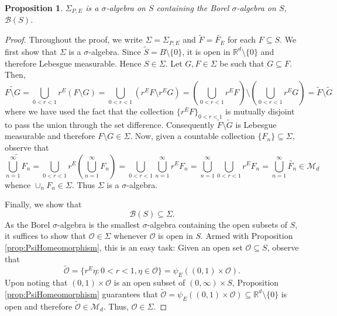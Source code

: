 \documentclass[11pt]{article}
\newtheorem{proposition}[theorem]{Proposition}
\theoremstyle{remark}
\begin{document}
\begin{proposition}\label{prop:BorelContainment}
$\Sigma_{P,E}$ is a $\sigma$-algebra on $S$ containing the Borel $\sigma$-algebra on $S$, $\mathcal{B}(S)$.
\end{proposition}

\begin{proof}
Throughout the proof, we write $\Sigma=\Sigma_{P,E}$ and $\widetilde{F}=\widetilde{F_E}$ for each $F\subseteq S$.
We first show that $\Sigma$ is a $\sigma$-algebra. Since $\widetilde S=B\setminus\{0\}$, it is open in $\mathbb{R}^d\setminus\{0\}$ and therefore Lebesgue measurable. Hence $S\in \Sigma$. Let $G, F\in \Sigma$ be such that $G\subseteq F$. Then,
\begin{equation*}
\widetilde{F\setminus G}=\bigcup_{0<r<1}r^E\left(F\setminus G\right)=\bigcup_{0<r<1}\left(r^EF\setminus r^E G\right)=\left(\bigcup_{0<r<1}r^E F\right)\setminus\left(\bigcup_{0<r<1}r^E G\right)=\widetilde F\setminus \widetilde G
\end{equation*}
where we have used the fact that the collection $\{r^E F\}_{0<r<1}$ is mutually disjoint to pass the union through the set difference. Consequently $\widetilde F\setminus \widetilde{G}$ is Lebesgue measurable and therefore $F\setminus G\in \Sigma$.  Now, given a countable collection $\{F_n\}\subseteq \Sigma$, observe that
\begin{equation*}
    \widetilde{\bigcup_{n=1}^\infty F_n}= \bigcup_{0<r<1}r^E \left(\bigcup_{n=1}^\infty F_n\right)= \bigcup_{0 <r< 1}  \bigcup_{n=1}^\infty  r^E F_n =\bigcup_{n=1}^\infty \bigcup_{0 <r < 1}  r^E F_n =\bigcup_{n=1}^\infty \widetilde{F_n} \in \mathcal{M}_d
\end{equation*}
whence $\cup_n F_n\in \Sigma$. Thus $\Sigma$ is a $\sigma$-algebra. 

Finally, we show that
\begin{equation*}
\mathcal{B}(S)\subseteq\Sigma.
\end{equation*}
As the Borel $\sigma$-algebra is the smallest $\sigma$-algebra containing the open subsets of $S$, it suffices to show that $\mathcal{O}\in \Sigma$ whenever $\mathcal{O}$ is open in $S$. Armed with Proposition \ref{prop:PsiHomeomorphism}, this is an easy task: Given an open set $\mathcal{O}\subseteq S$, observe that
\begin{equation*}
\widetilde{\mathcal{O}}=\{r^E\eta:0<r<1,\eta\in\mathcal{O}\}=\psi_E((0,1)\times\mathcal{O}).
\end{equation*}
Upon noting that $(0,1)\times\mathcal{O}$ is an open subset of $(0,\infty)\times S$, Proposition \ref{prop:PsiHomeomorphism} guarantees that $\widetilde{\mathcal{O}}=\psi_E((0,1)\times\mathcal{O})\subseteq\mathbb{R}^d\setminus\{0\}$ is open and therefore $\widetilde{\mathcal{O}} \in \mathcal{M}_d$. Thus, $\mathcal{O}\in \Sigma$.
\end{proof}
\end{document}
